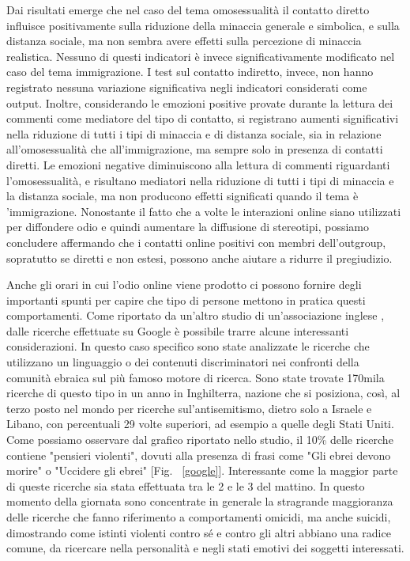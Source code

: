 Dai risultati emerge che nel caso del tema omosessualità il contatto diretto influisce positivamente sulla riduzione della minaccia generale e simbolica, e sulla distanza sociale, ma non sembra avere effetti sulla percezione di minaccia realistica. Nessuno di questi indicatori è invece significativamente modificato nel caso del tema immigrazione. I test sul contatto indiretto, invece, non hanno registrato nessuna variazione significativa negli indicatori considerati come output.
Inoltre, considerando le emozioni positive provate durante la lettura dei commenti come mediatore del tipo di contatto, si registrano aumenti significativi nella riduzione di tutti i tipi di minaccia e di distanza sociale, sia in relazione all’omosessualità che all’immigrazione, ma sempre solo in presenza di contatti diretti. Le emozioni negative diminuiscono alla lettura di commenti riguardanti l'omosessualità, e risultano mediatori nella riduzione di tutti i tipi di minaccia e la distanza sociale, ma non producono effetti significati quando il tema è 'immigrazione.
Nonostante il fatto che a volte le interazioni online siano utilizzati per diffondere odio e quindi aumentare la diffusione di stereotipi, possiamo concludere affermando che i contatti online positivi con membri dell'outgroup, sopratutto se diretti e non estesi, possono anche aiutare a ridurre il pregiudizio.

Anche gli orari in cui l'odio online viene prodotto ci possono fornire degli importanti spunti per capire che tipo di persone mettono in pratica questi comportamenti.
Come riportato da un'altro studio di un'associazione inglese \citep{cts2019}, dalle ricerche effettuate su Google è possibile trarre alcune interessanti considerazioni. In questo caso specifico sono state analizzate le ricerche che utilizzano un linguaggio o dei contenuti discriminatori nei confronti della comunità ebraica sul più famoso motore di ricerca. Sono state trovate 170mila ricerche di questo tipo in un anno in Inghilterra, nazione che si posiziona, così, al terzo posto nel mondo per ricerche sul’antisemitismo, dietro solo a Israele e Libano, con percentuali 29 volte superiori, ad esempio a quelle degli Stati Uniti. Come possiamo osservare dal grafico riportato nello studio, il 10\% delle ricerche contiene "pensieri violenti", dovuti alla presenza di frasi come "Gli ebrei devono morire" o "Uccidere gli ebrei" [Fig. ~\ref{google}]. Interessante come la maggior parte di queste ricerche sia stata effettuata tra le 2 e le 3 del mattino. In questo momento della giornata sono concentrate in generale la stragrande maggioranza delle ricerche che fanno riferimento a comportamenti omicidi, ma anche suicidi, dimostrando come istinti violenti contro sé e contro gli altri abbiano una radice comune, da ricercare nella personalità e negli stati emotivi dei soggetti interessati.

